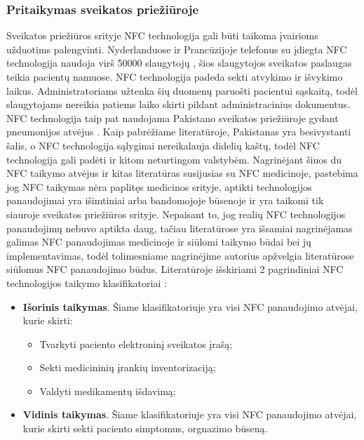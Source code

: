 \subsubsection{Pritaikymas sveikatos priežiūroje}
Sveikatos priežiūros srityje NFC technologija gali būti taikoma įvairioms užduotims palengvinti. Nyderlanduose ir Prancūzijoje telefonus su įdiegta NFC technologija naudoja virš 50000 slaugytojų \cite{ShyamThangaraju2013}, šios slaugytojos sveikatos paslaugas teikia pacientų namuose. NFC technologija padeda sekti atvykimo ir išvykimo laikus. Administratoriams užtenka šių duomenų paruošti pacientui sąskaitą, todėl slaugytojams nereikia patiems laiko skirti pildant administracinius dokumentus. NFC technologija taip pat naudojama Pakistano sveikatos priežiūroje gydant pneumonijos atvėjus \cite{Marcus}. Kaip pabrėžiame literatūroje, Pakistanas yra besivystanti šalis, o NFC technologija sąlyginai nereikalauja didelių kaštų, todėl NFC technologija gali padėti ir kitom neturtingom valstybėm. Nagrinėjant šiuos du NFC taikymo atvėjus ir kitas literatūras susijusias su NFC medicinoje, pastebima jog NFC taikymas nėra paplitęs medicinos srityje, aptikti technologijos panaudojimai yra išimtiniai arba bandomojoje būsenoje ir yra taikomi tik siauroje sveikatos priežiūros srityje. Nepaisant to, jog realių NFC technologijos panaudojimų nebuvo aptikta daug, tačiau literatūrose yra išsamiai nagrinėjamas galimas NFC panaudojimas medicinoje ir siūlomi taikymo būdai bei jų implementavimas, todėl tolimesniame nagrinėjime autorius apžvelgia literatūrose siūlomus NFC panaudojimo būdus. Literatūroje išskiriami 2 pagrindiniai NFC technologijos taikymo klasifikatoriai \cite{Gautam}:
\begin{itemize}
    \item \textbf{Išorinis taikymas}. Šiame klasifikatoriuje yra visi NFC panaudojimo atvėjai, kurie skirti:
        \begin{itemize}
            \item Tvarkyti paciento elektroninį sveikatos įrašą;  
            \item Sekti medicininių įrankių inventorizaciją;
            \item Valdyti medikamentų išdavimą;
        \end{itemize}
    \item \textbf{Vidinis taikymas}. Šiame klasifikatoriuje yra visi NFC panaudojimo atvėjai, kurie skirti sekti paciento simptomus, orgnazimo būseną.
\end{itemize}
 
